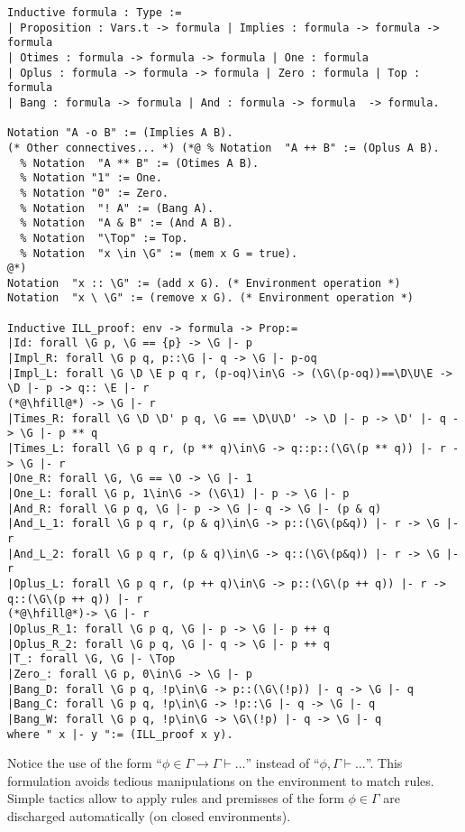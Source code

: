 \documentclass[runningheads,a4paper]{llncs}
\begin{document}
\begin{lstlisting}
Inductive formula : Type := 
| Proposition : Vars.t -> formula | Implies : formula -> formula -> formula 
| Otimes : formula -> formula -> formula | One : formula 
| Oplus : formula -> formula -> formula | Zero : formula | Top : formula
| Bang : formula -> formula | And : formula -> formula  -> formula.

Notation "A -o B" := (Implies A B).
(* Other connectives... *) (*@ % Notation  "A ++ B" := (Oplus A B).
  % Notation  "A ** B" := (Otimes A B).
  % Notation "1" := One.
  % Notation "0" := Zero.
  % Notation  "! A" := (Bang A).
  % Notation  "A & B" := (And A B).
  % Notation  "\Top" := Top.
  % Notation  "x \in \G" := (mem x G = true).
@*)
Notation  "x :: \G" := (add x G). (* Environment operation *)
Notation  "x \ \G" := (remove x G). (* Environment operation *)
 
Inductive ILL_proof: env -> formula -> Prop:=
|Id: forall \G p, \G == {p} -> \G |- p
|Impl_R: forall \G p q, p::\G |- q -> \G |- p-oq
|Impl_L: forall \G \D \E p q r, (p-oq)\in\G -> (\G\(p-oq))==\D\U\E -> \D |- p -> q:: \E |- r
(*@\hfill@*) -> \G |- r
|Times_R: forall \G \D \D' p q, \G == \D\U\D' -> \D |- p -> \D' |- q -> \G |- p ** q
|Times_L: forall \G p q r, (p ** q)\in\G -> q::p::(\G\(p ** q)) |- r -> \G |- r
|One_R: forall \G, \G == \O -> \G |- 1
|One_L: forall \G p, 1\in\G -> (\G\1) |- p -> \G |- p
|And_R: forall \G p q, \G |- p -> \G |- q -> \G |- (p & q)
|And_L_1: forall \G p q r, (p & q)\in\G -> p::(\G\(p&q)) |- r -> \G |- r
|And_L_2: forall \G p q r, (p & q)\in\G -> q::(\G\(p&q)) |- r -> \G |- r
|Oplus_L: forall \G p q r, (p ++ q)\in\G -> p::(\G\(p ++ q)) |- r -> q::(\G\(p ++ q)) |- r
(*@\hfill@*)-> \G |- r
|Oplus_R_1: forall \G p q, \G |- p -> \G |- p ++ q
|Oplus_R_2: forall \G p q, \G |- q -> \G |- p ++ q 
|T_: forall \G, \G |- \Top
|Zero_: forall \G p, 0\in\G -> \G |- p
|Bang_D: forall \G p q, !p\in\G -> p::(\G\(!p)) |- q -> \G |- q
|Bang_C: forall \G p q, !p\in\G -> !p::\G |- q -> \G |- q
|Bang_W: forall \G p q, !p\in\G -> \G\(!p) |- q -> \G |- q
where " x |- y ":= (ILL_proof x y).
\end{lstlisting}


Notice the use of the form ``$\phi\in\Gamma \to \Gamma\vdash\dots$''
instead of ``$\phi,\Gamma\vdash\dots$''. This formulation avoids
tedious manipulations on the environment to match rules. Simple
tactics allow to apply rules and premisses of the form $\phi\in\Gamma$
are discharged automatically (on closed environments).
\end{document}
